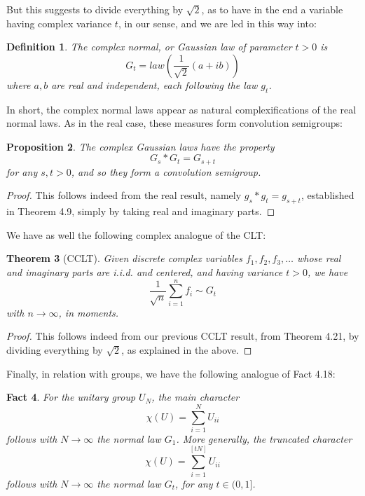 \documentclass[12pt]{amsbook}
\newtheorem{theorem}{Theorem}[chapter]
\newtheorem{definition}[theorem]{Definition}
\newtheorem{fact}[theorem]{Fact}
\newtheorem{proposition}[theorem]{Proposition}
\begin{document}
But this suggests to divide everything by $\sqrt{2}$, as to have in the end a variable having complex variance $t$, in our sense, and we are led in this way into:


\begin{definition}
The complex normal, or Gaussian law of parameter $t>0$ is
$$G_t=law\left(\frac{1}{\sqrt{2}}(a+ib)\right)$$
where $a,b$ are real and independent, each following the law $g_t$.
\end{definition}

In short, the complex normal laws appear as natural complexifications of the real normal laws. As in the real case, these measures form convolution semigroups:


\begin{proposition}
The complex Gaussian laws have the property
$$G_s*G_t=G_{s+t}$$
for any $s,t>0$, and so they form a convolution semigroup.
\end{proposition}

\begin{proof}
This follows indeed from the real result, namely $g_s*g_t=g_{s+t}$, established in Theorem 4.9, simply by taking real and imaginary parts.
\end{proof}

We have as well the following complex analogue of the CLT:


\begin{theorem}[CCLT]
Given discrete complex variables $f_1,f_2,f_3,\ldots$ whose real and imaginary parts are i.i.d. and centered, and having variance $t>0$, we have
$$\frac{1}{\sqrt{n}}\sum_{i=1}^nf_i\sim G_t$$
with $n\to\infty$, in moments.
\end{theorem}

\begin{proof}
This follows indeed from our previous CCLT result, from Theorem 4.21, by dividing everything by $\sqrt{2}$, as explained in the above.
\end{proof}

Finally, in relation with groups, we have the following analogue of Fact 4.18:

\begin{fact}
For the unitary group $U_N$, the main character
$$\chi(U)=\sum_{i=1}^NU_{ii}$$
follows with $N\to\infty$ the normal law $G_1$. More generally, the truncated character
$$\chi(U)=\sum_{i=1}^{[tN]}U_{ii}$$
follows with $N\to\infty$ the normal law $G_t$, for any $t\in(0,1]$. 
\end{fact}
\end{document}
